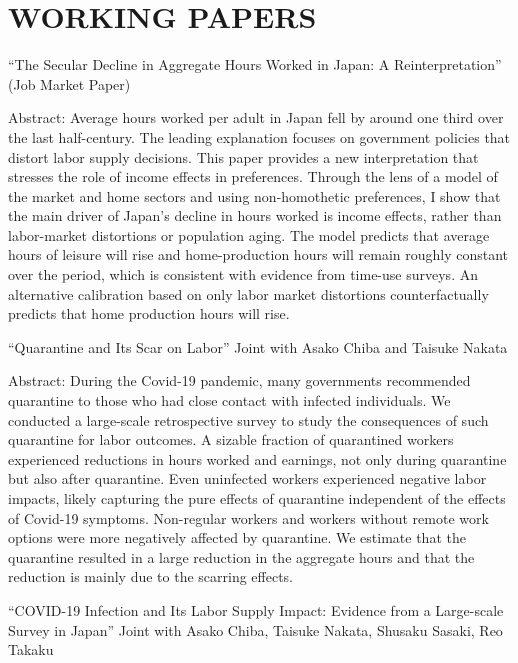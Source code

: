 \documentclass[12pt]{article}
\begin{document}
\section*{WORKING PAPERS}
``The Secular Decline in Aggregate Hours Worked in Japan: A Reinterpretation'' (Job Market Paper)
\begin{adjustwidth}{1em}{1em}
Abstract: Average hours worked per adult in Japan fell by around one third over the last half-century. The leading explanation focuses on government policies that distort labor supply decisions. This paper provides a new interpretation that stresses the role of income effects in preferences. Through the lens of a model of the market and home sectors and using non-homothetic preferences, I show that the main driver of Japan's decline in hours worked is income effects, rather than labor-market distortions or population aging. The model predicts that average hours of leisure will rise and home-production hours will remain roughly constant over the period, which is consistent with evidence from time-use surveys. An alternative calibration based on only labor market distortions counterfactually predicts that home production hours will rise.
\end{adjustwidth}
\vspace{1em}
``Quarantine and Its Scar on Labor'' Joint with Asako Chiba and Taisuke Nakata
\begin{adjustwidth}{1em}{1em}
Abstract: During the Covid-19 pandemic, many governments recommended quarantine to those who had close contact with infected individuals. We conducted a large-scale retrospective survey to study the consequences of such quarantine for labor outcomes. A sizable fraction of quarantined workers experienced reductions in hours worked and earnings, not only during quarantine but also after quarantine. Even uninfected workers experienced negative labor impacts, likely capturing the pure effects of quarantine independent of the effects of Covid-19 symptoms. Non-regular workers and workers without remote work options were more negatively affected by quarantine. We estimate that the quarantine resulted in a large reduction in the aggregate hours and that the reduction is mainly due to the scarring effects.
\end{adjustwidth}
\vspace{1em}
``COVID-19 Infection and Its Labor Supply Impact: Evidence from a Large-scale Survey in Japan'' Joint with Asako Chiba, Taisuke Nakata, Shusaku Sasaki, Reo Takaku
\end{document}
